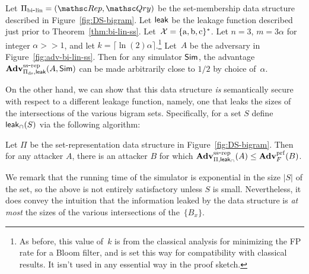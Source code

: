 \begin{theorem}\label{thm:bi-ds-ss}
Let $\setprim_{\bilin}= (\Rep, \Qry)$ be the set-membership data
structure described in Figure~\ref{fig:DS-bigram}. Let ${\sf leak}$ be
the leakage function described just prior to
Theorem~\ref{thm:bi-lin-ss}. Let~${\cal X}=\{\mathrm{a,b,c}\}^*$. Let
$n=3$,  $m=3\alpha $ for integer $\alpha >> 1$, and let $k = \lceil
\ln(2) \alpha \rceil$.\footnote{As before, this value of~$k$ is from the
classical analysis for minimizing the FP rate for a Bloom filter,
and is set this way for compatibility with classical results.  It
isn't used in any essential way in the proof sketch.}  Let~$A$ be
the adversary in Figure~\ref{fig:adv-bi-lin-ss}.  Then for any
simulator ${\sf Sim}$, the advantage
$\mathrm{\mathbf{Adv}}^{\mathrm{ss\mbox{-}rep}}_{\Pi_{\mathrm{ds}},{\sf leak}}(A,{\sf Sim})$ can be made
arbitrarily close to $1/2$ by choice of~$\alpha$.
\end{theorem}

On the other hand, we can show that this data structure \emph{is}
semantically secure with respect to a different leakage function,
namely, one that leaks the sizes of the intersections of the various
bigram sets. Specifically, for a set $S$ define ${\sf leak}_\cap(S)$
via the following algorithm:

\begin{figure}[h]
\centering
{}
\end{figure}

\begin{theorem} \label{thm:bi-ds-prf-priv-ss}
Let $\Pi$ be the set-representation data structure in
Figure~\ref{fig:DS-bigram}. Then for any attacker $A$, there is an
attacker $B$
for which
$\mathrm{\mathbf{Adv}}^{\mathrm{ss\mbox{-}rep}}_{\Pi,{\sf leak}_\cap}(A) \leq \mathbf{Adv}^{\mathrm{prf}}_{F}(B)$.
\end{theorem}

We remark that the running time of the simulator is exponential in
the size $|S|$ of the set, so the above is not entirely satisfactory
unless $S$ is small. Nevertheless, it does convey the intuition that
the information leaked by the data structure is \emph{at most} the
sizes of the various intersections of the~$\{B_x\}$.

